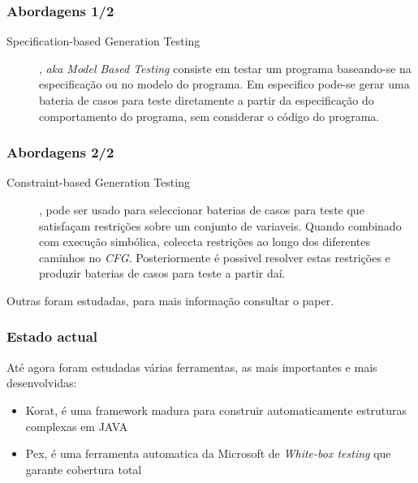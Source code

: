 \documentclass{beamer}
\begin{document}
\begin{frame}\frametitle{Abordagens 1/2}
\begin{description}
\item[Specification-based Generation Testing], \textit{aka Model Based Testing} consiste em testar um programa baseando-se na especificação ou no modelo do programa.
Em especifico pode-se gerar uma bateria de casos para teste diretamente a partir da especificação do comportamento do programa, sem considerar o código do programa.
\end{description}
\end{frame}

\begin{frame}\frametitle{Abordagens 2/2}
\begin{description}
\item[Constraint-based Generation Testing], pode ser usado para seleccionar baterias de casos para teste que satisfaçam restrições sobre um conjunto de variaveis.
Quando combinado com execução simbólica, coleccta restrições ao longo dos diferentes caminhos no \textit{CFG}.
Posteriormente é possivel resolver estas restrições e produzir baterias de casos para teste a partir daí.
\end{description}
Outras foram estudadas, para mais informação consultar o paper.
\end{frame}

\begin{frame}\frametitle{Estado actual}
Até agora foram estudadas várias ferramentas, as mais importantes e mais desenvolvidas:
\begin{itemize}
\item Korat, é uma framework madura para construir automaticamente estruturas complexas em JAVA
\item Pex, é uma ferramenta automatica da Microsoft de \textit{White-box testing} que garante cobertura total
\end{itemize}
\end{frame}
\end{document}
